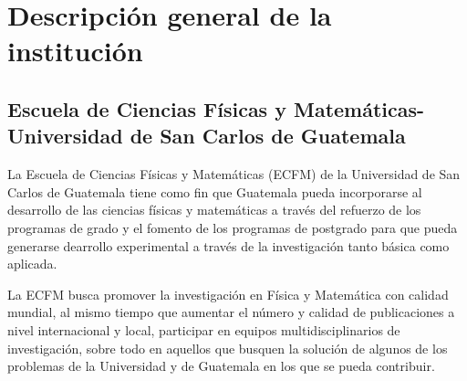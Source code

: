 \section{Descripción general de la institución}

\begin{comment}
\subsection{Escuela de Ciencias Físicas y Matemáticas - Universidad      de San	Carlos de Guatemala}


El Instituto de Investigación de Ciencias Físicas y Matemáticas (IFIM) es la unidad de la Escuela de Ciencias Físicas y Matemáticas de la Universidad de San Carlos (ECFM) que promueve y realiza estudios avanzados en áreas científicas, fundamentales y aplicadas, de las ciencias físicas y matemáticas.  El IFIM trabaja en la investigación de ciencia básica y aplicada. Se encarga de promover la investigación en estas en el ámbito universitario, de difundir y divulgar del conocimiento generado por la investigación en ciencias físicas y matemáticas, así como también de actualizar programas académicos de ciencias físicas y matemáticas.


Las principales áreas y líneas de investigación son: Física de altas energías, cosmología y astrofísica, Ciencias no lineales y sistemas complejos, Geofísica, Física experimental y Física de radiaciones.

\end{comment}



\subsection{Escuela de Ciencias Físicas y Matemáticas-Universidad de San Carlos de Guatemala}

La Escuela de Ciencias Físicas y Matemáticas (ECFM) de la Universidad de San Carlos de Guatemala tiene como fin que Guatemala pueda incorporarse al desarrollo de las ciencias físicas y matemáticas a través del refuerzo de los programas de grado y el fomento de los programas de postgrado para que pueda generarse dearrollo experimental a través de la investigación tanto básica como aplicada.

La ECFM busca promover la investigación en Física y Matemática con calidad mundial, al mismo tiempo que aumentar el número y calidad  de publicaciones a nivel internacional y local, participar en equipos multidisciplinarios de investigación, sobre todo en aquellos que busquen la solución de algunos de los problemas de la Universidad y de Guatemala en los que se pueda contribuir. 



